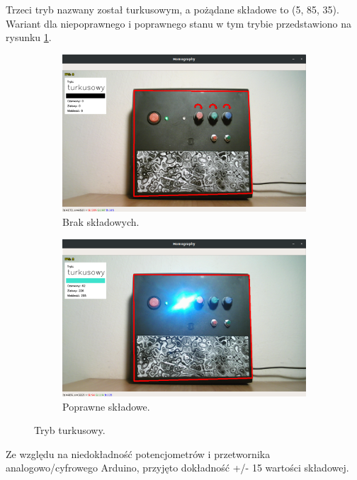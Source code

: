 \documentclass[12pt,twoside,polish]{article}
\begin{document}
Trzeci tryb nazwany został turkusowym, a pożądane składowe to (5, 85, 35). Wariant dla niepoprawnego i poprawnego stanu w tym trybie przedstawiono na rysunku \ref{turk}.

\begin{figure}[htb!]
	\centering
	\begin{subfigure}[b]{0.7\textwidth}
		\includegraphics[width=\textwidth]{turk2}
		\caption{Brak składowych.}
	\end{subfigure}
	\begin{subfigure}[b]{0.7\textwidth}
		\includegraphics[width=\textwidth]{turk1}
		\caption{Poprawne składowe.}
	\end{subfigure}
	\caption{Tryb turkusowy.}
	\label{turk}
\end{figure}

Ze względu na niedokładność potencjometrów i przetwornika analogowo/cyfrowego Arduino, przyjęto dokładność +/- 15 wartości składowej.
\end{document}
